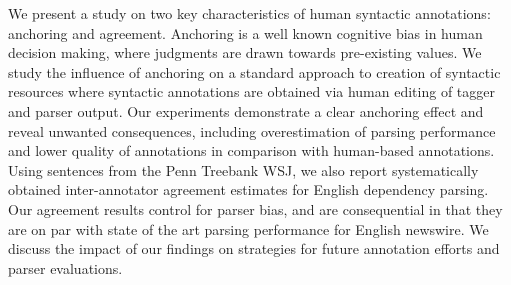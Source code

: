 We present a study on two key characteristics of human syntactic annotations: anchoring and agreement. Anchoring is a well known cognitive bias in human decision making, where judgments are drawn towards pre-existing values. We study the influence of anchoring on a standard approach to creation of syntactic resources where syntactic annotations are obtained via human editing of tagger and parser output. Our experiments demonstrate a clear anchoring effect and reveal unwanted consequences, including overestimation of parsing performance and lower quality of annotations in comparison with human-based annotations. Using sentences from the Penn Treebank WSJ, we also report systematically obtained inter-annotator agreement estimates for English dependency parsing. Our agreement results control for parser bias, and are consequential in that they are on par with state of the art parsing performance for English newswire. We discuss the impact of our findings on strategies for future annotation efforts and parser evaluations.
